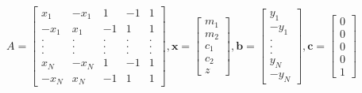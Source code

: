 \documentclass[11pt]{article}
\begin{document}
$$A=\begin{bmatrix}x_1&-x_1&1&-1&1\\-x_1&x_1&-1&1&1\\.&.&.&.&.\\.&.&.&.&.\\.&.&.&.&.\\x_N&-x_N&1&-1&1\\-x_N&x_N&-1&1&1\end{bmatrix}, \mathbf{x}=\begin{bmatrix}m_1\\m_2\\c_1\\c_2\\z\end{bmatrix}, \mathbf{b}=\begin{bmatrix}y_1\\-y_1\\.\\.\\.\\y_N\\-y_N\end{bmatrix}, \mathbf{c}=\begin{bmatrix}0\\0\\0\\0\\1\end{bmatrix}$$

\newpage
\end{document}
